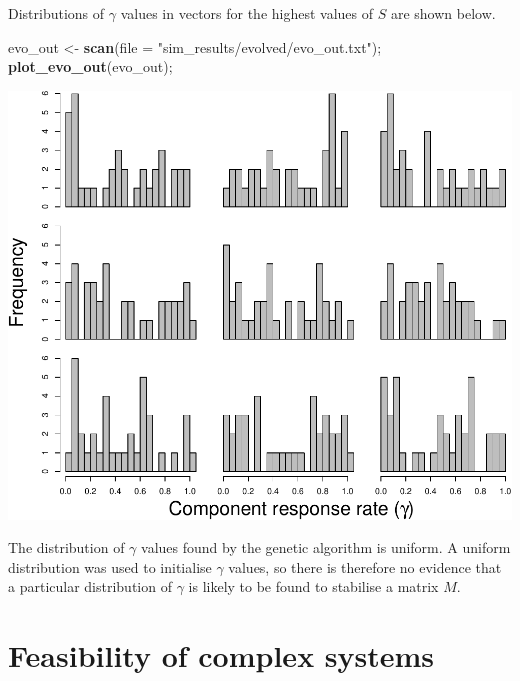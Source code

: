 \documentclass[]{article}
\newenvironment{Shaded}{\begin{snugshade}}{\end{snugshade}}
\newcommand{\KeywordTok}[1]{\textcolor[rgb]{0.13,0.29,0.53}{\textbf{{#1}}}}
\newcommand{\DataTypeTok}[1]{\textcolor[rgb]{0.13,0.29,0.53}{{#1}}}
\newcommand{\StringTok}[1]{\textcolor[rgb]{0.31,0.60,0.02}{{#1}}}
\newcommand{\NormalTok}[1]{{#1}}
\begin{document}
Distributions of \(\gamma\) values in vectors for the highest values of
\(S\) are shown below.

\begin{Shaded}
\begin{Highlighting}[]
\NormalTok{evo_out <-}\StringTok{ }\KeywordTok{scan}\NormalTok{(}\DataTypeTok{file =} \StringTok{"sim_results/evolved/evo_out.txt"}\NormalTok{);}
\KeywordTok{plot_evo_out}\NormalTok{(evo_out);}
\end{Highlighting}
\end{Shaded}

\includegraphics{SI_files/figure-latex/unnamed-chunk-31-1.pdf}

The distribution of \(\gamma\) values found by the genetic algorithm is
uniform. A uniform distribution was used to initialise \(\gamma\)
values, so there is therefore no evidence that a particular distribution
of \(\gamma\) is likely to be found to stabilise a matrix \(M\).

\hypertarget{Feasibility}{\section{Feasibility of complex
systems}\label{Feasibility}}
\end{document}
